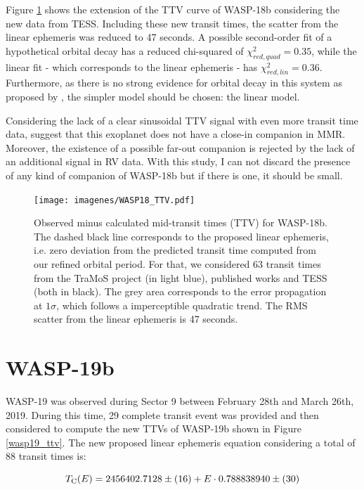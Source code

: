 Figure \ref{wasp18_ttv} shows the extension of the TTV curve of WASP-18b considering the new data from TESS. Including these new transit times, the scatter from the linear ephemeris was reduced to 47 seconds. A possible second-order fit of a hypothetical orbital decay has a reduced chi-squared of $\chi^{2}_{red,quad}=0.35$, while the linear fit - which corresponds to the linear ephemeris - has $\chi^{2}_{red,lin}=0.36$. Furthermore, as there is no strong evidence for orbital decay in this system as proposed by \cite{Wilkins2017}, the simpler model should be chosen: the linear model.

Considering the lack of a clear sinusoidal TTV signal with even more transit time data, suggest that this exoplanet does not have a close-in companion in MMR. Moreover, the existence of a possible far-out companion is rejected by the lack of an additional signal in RV data. With this study, I can not discard the presence of any kind of companion of WASP-18b but if there is one, it should be small. 


\begin{figure}[h]
\texttt{[image: imagenes/WASP18\_TTV.pdf]}
\caption{Observed minus calculated mid-transit times (TTV) for WASP-18b. The dashed black line corresponds to the proposed linear ephemeris, i.e. zero deviation from the predicted transit time  computed from our refined orbital period. For that, we considered 63 transit times from the TraMoS project (in light blue), published works and TESS (both in black). The grey area corresponds to the error propagation at $1\sigma$, which follows a imperceptible quadratic trend. The RMS scatter from the linear ephemeris is 47 seconds.}
\label{wasp18_ttv}
\end{figure}

\section{WASP-19b}

WASP-19 was observed during Sector 9 between February 28th and March 26th, 2019. During this time, 29 complete transit event was provided and then considered to compute the new TTVs of WASP-19b shown in Figure \ref{wasp19_ttv}. The new proposed linear ephemeris equation considering a total of 88 transit times is:

\begin{equation}
T_{\rm C}(E)=2456402.7128\pm(16)+E \cdot 0.788838940 \pm(30)
\end{equation}

